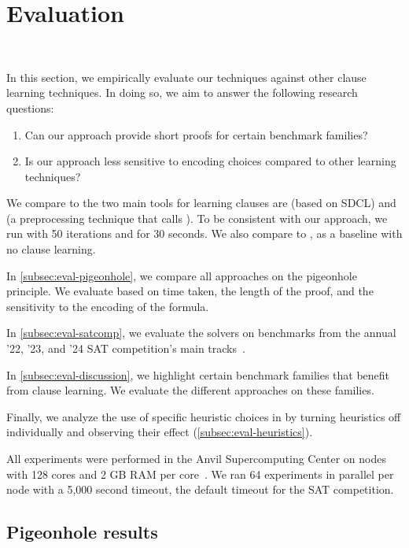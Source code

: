 \section{Evaluation}~\label{sec:evaluation}

In this section, we empirically evaluate our techniques against other \pr clause
learning techniques. In doing so, we aim to answer the following research questions:


\begin{enumerate}
    \item Can our approach provide short \pr proofs for certain benchmark families?
    \item Is our approach less sensitive to encoding choices compared to other
    \pr learning techniques?
\end{enumerate}


We compare to the two main tools for learning \pr clauses are \sadical (based on SDCL)
and \prelearn (a preprocessing technique that calls \sadical). To be consistent with our approach,
we run \prelearn with 50 iterations and for 30 seconds. We also compare to \cadical, as a baseline with no \pr clause learning.

In \autoref{subsec:eval-pigeonhole}, we compare all approaches
on the pigeonhole principle. We evaluate based on time taken, the length of
the proof, and the sensitivity to the encoding of the formula. 

In \autoref{subsec:eval-satcomp}, we evaluate the solvers on benchmarks from the
annual '22, '23, and '24 SAT competition's main
tracks~\cite{satcomp2022,satcomp2023,satcomp2024}.

In \autoref{subsec:eval-discussion}, we highlight certain benchmark families
that benefit from \pr clause learning. We evaluate the different approaches on these families.


Finally, we analyze the use of specific heuristic choices in \tool
by turning heuristics off individually and observing their effect (\autoref{subsec:eval-heuristics}). 

All experiments were performed in the Anvil Supercomputing Center on nodes with
128 cores and 2 GB RAM per core~\cite{anvil}. We ran 64 experiments in parallel per node
with a 5,000 second timeout, the default timeout for the SAT competition.

\subsection{Pigeonhole results}~\label{subsec:eval-pigeonhole}

